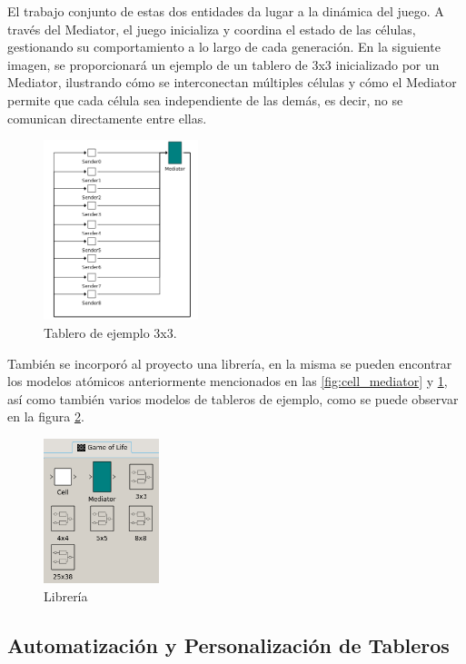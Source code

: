\documentclass[]{article}
\begin{document}
El trabajo conjunto de estas dos entidades da lugar a la dinámica del juego. A través del Mediator, el juego inicializa y coordina el estado de las células, gestionando su comportamiento a lo largo de cada generación. En la siguiente imagen, se proporcionará un ejemplo de un tablero de 3x3 inicializado por un Mediator, ilustrando cómo se interconectan múltiples células y cómo el Mediator permite que cada célula sea independiente de las demás, es decir, no se comunican directamente entre ellas.

\begin{figure}[H]
  \centering
  \includegraphics[width=0.4\textwidth]{../assets/pdevs/3x3_board.png}
  \caption{Tablero de ejemplo 3x3.}
  \label{fig:board}
\end{figure}

También se incorporó al proyecto una librería, en la misma se pueden encontrar los modelos atómicos anteriormente mencionados en las \ref{fig:cell_mediator} y \ref{fig:board}, así como también varios modelos de tableros de ejemplo, como se puede observar en la figura \ref{fig:library}.

\begin{figure}[H]
  \centering
  \includegraphics[width=0.3\textwidth]{../assets/pdevs/library.png}
  \caption{Librería}
  \label{fig:library}
\end{figure}

\subsection{Automatización y Personalización de Tableros}
\end{document}
